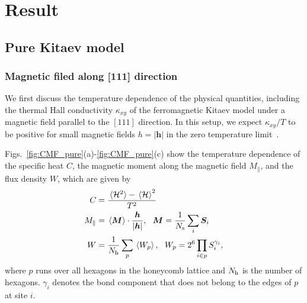\documentclass[twocolumn,superscriptaddress,showpacs, longbibliography, aps, prb]{revtex4-2}
\def\vec#1{\boldsymbol #1}
\newcommand{\orange}[1]{\textcolor{orange}{#1}}
\begin{document}
\clearpage
\section{Result}
\subsection{Pure Kitaev model}
\label{sec:pureKitaev}
\subsubsection{Magnetic filed along [111] direction}
We first discuss the temperature dependence of the
physical quantities, including the thermal Hall conductivity $\kappa_{xy}$ of the 
ferromagnetic Kitaev model %
under a magnetic field parallel to the $[111]$ direction. 
In this setup, we expect %
$\kappa_{xy}/T$ to be positive
for small magnetic fields $h = |\vec{h}|$ in 
the zero temperature limit~\cite{Kitaev2006}. 

Figs.~\ref{fig:CMF_pure}(a)-\ref{fig:CMF_pure}(c) show the temperature dependence of 
the specific heat 
$C$, the magnetic moment along the magnetic field $M_{\parallel}$, and the flux density $W$, which are 
given by
\begin{align}
C&=\frac{\ev*{{\cal H}^{2}}-\ev*{{\cal H}}^2}{T^2} \\
M_{\parallel}&=\ev*{\vec{M}}%
\cdot\frac{\vec{h}}{|\vec{h}|},~~\vec{M}=\frac{1}{N_{\rm s}}\sum_{i}\vec{S}_{i} \\
W&=\frac{1}{N_{\rm h}}\sum_{p}\ev*{W_{p}}, %
~~W_{p}=2^6\prod_{i\in p}S^{\gamma_{i}}_{i},
\end{align}
where $p$ runs over all hexagons in the honeycomb lattice and $N_{\rm h}$ is the number of hexagons. $\gamma_{i}$ %
denotes the bond component %
that does not belong to the edges of $p$ at site $i$.

\end{document}
